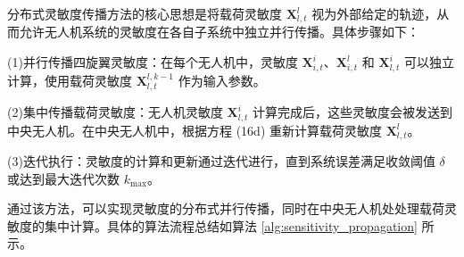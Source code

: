 \documentclass[lang=chs, degree=master, blindreview=false, winfonts=true]{yanputhesis}
\begin{document}

分布式灵敏度传播方法的核心思想是将载荷灵敏度 $\mathbf{X}_{l,t}^l$ 视为外部给定的轨迹，从而允许无人机系统的灵敏度在各自子系统中独立并行传播。具体步骤如下：

(1)并行传播四旋翼灵敏度：在每个无人机中，灵敏度 $\mathbf{X}_{i,t}^i$、$\mathbf{X}_{i,t}^l$ 和 $\mathbf{X}_{l,t}^i$ 可以独立计算，使用载荷灵敏度 $\mathbf{X}_{l,t}^{l,k-1}$ 作为输入参数。

(2)集中传播载荷灵敏度：无人机灵敏度 $\mathbf{X}_{l,t}^i$ 计算完成后，这些灵敏度会被发送到中央无人机。在中央无人机中，根据方程 (16d) 重新计算载荷灵敏度 $\mathbf{X}_{l,t}^l$。

(3)迭代执行：灵敏度的计算和更新通过迭代进行，直到系统误差满足收敛阈值 $\delta$ 或达到最大迭代次数 $k_{\text{max}}$。


通过该方法，可以实现灵敏度的分布式并行传播，同时在中央无人机处处理载荷灵敏度的集中计算。具体的算法流程总结如算法 \ref{alg:sensitivity_propagation} 所示。
\end{document}
